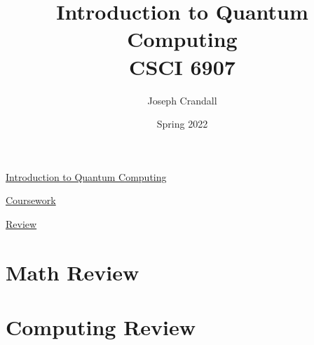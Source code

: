
\usepackage{algorithm, algpseudocode, color, gensymb, siunitx, soul, subfiles}
\usepackage[a4paper, total={7.5in, 10in}]{geometry}

\title{Introduction to Quantum Computing\\
\large CSCI 6907}
\author{Joseph Crandall}
\date{Spring 2022}


\maketitle

\href{https://www2.seas.gwu.edu/~simhaweb/quantum/index.html}{Introduction to Quantum Computing}

\href{https://www2.seas.gwu.edu/~simhaweb/quantum/coursework.html}{Coursework}


\href{https://www2.seas.gwu.edu/~simhaweb/quantum/modules/review/review.html}{Review}

%

\section{Math Review}


\section{Computing Review}


%

%

%

